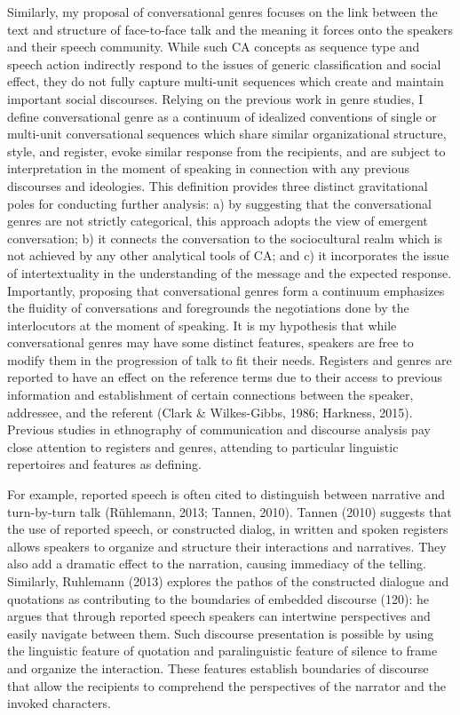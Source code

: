 \documentclass[12pt]{turabian-researchpaper}
\begin{document}
Similarly, my proposal of conversational genres focuses on the link between the text and structure of face-to-face talk and the meaning it forces onto the speakers and their speech community. While such CA concepts as sequence type and speech action indirectly respond to the issues of generic classification and social effect, they do not fully capture multi-unit sequences which create and maintain important social discourses. Relying on the previous work in genre studies, I define conversational genre as a continuum of idealized conventions of single or multi-unit conversational sequences which share similar organizational structure, style, and register, evoke similar response from the recipients, and are subject to interpretation in the moment of speaking in connection with any previous discourses and ideologies.  This definition provides three distinct gravitational poles for conducting further analysis: a) by suggesting that the conversational genres are not strictly categorical, this approach adopts the view of emergent conversation; b) it connects the conversation to the sociocultural realm which is not achieved by any other analytical tools of CA; and c) it incorporates the issue of intertextuality in the understanding of the message and the expected response. Importantly, proposing that conversational genres form a continuum emphasizes the fluidity of conversations and foregrounds the negotiations done by the interlocutors at the moment of speaking. It is my hypothesis that while conversational genres may have some distinct features, speakers are free to modify them in the progression of talk to fit their needs. 
Registers and genres are reported to have an effect on the reference terms due to their access to previous information and establishment of certain connections between the speaker, addressee, and the referent (Clark \& Wilkes-Gibbs, 1986; Harkness, 2015). Previous studies in ethnography of communication and discourse analysis pay close attention to registers and genres, attending to particular linguistic repertoires and features as defining. 

For example, reported speech is often cited to distinguish between narrative and turn-by-turn talk (Rühlemann, 2013; Tannen, 2010). Tannen (2010) suggests that the use of reported speech, or constructed dialog, in written and spoken registers allows speakers to organize and structure their interactions and narratives. They also add a dramatic effect to the narration, causing immediacy of the telling. Similarly, Ruhlemann (2013) explores the pathos of the constructed dialogue and quotations as contributing to the boundaries of embedded discourse (120): he argues that through reported speech speakers can intertwine perspectives and easily navigate between them. Such discourse presentation is possible by using the linguistic feature of quotation and paralinguistic feature of silence to frame and organize the interaction. These features establish boundaries of discourse that allow the recipients to comprehend the perspectives of the narrator and the invoked characters.
\end{document}
